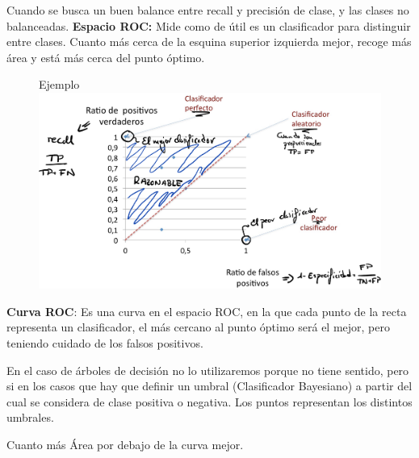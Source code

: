 \documentclass[12pt, twoside, openright]{report} %
\begin{document}
Cuando se busca un buen balance entre recall y precisión de clase, y las
clases no balanceadas.
\newpage
\textbf{Espacio ROC:} Mide como de útil es un clasificador para
distinguir entre clases. Cuanto más cerca de la esquina superior
izquierda mejor, recoge más área y está más cerca del punto óptimo.
\begin{figure}[H]
	Ejemplo
	{\includegraphics[scale=.2]{Untitled 12.png}}
\end{figure}
\textbf{Curva ROC}: Es una curva en el espacio ROC, en la que cada punto
de la recta representa un clasificador, el más cercano al punto óptimo
será el mejor, pero teniendo cuidado de los falsos positivos.

En el caso de árboles de decisión no lo utilizaremos porque no tiene
sentido, pero si en los casos que hay que definir un umbral
(Clasificador Bayesiano) a partir del cual se considera de clase positiva
o negativa. Los puntos representan los distintos umbrales.

Cuanto más Área por debajo de la curva mejor.
\end{document}
